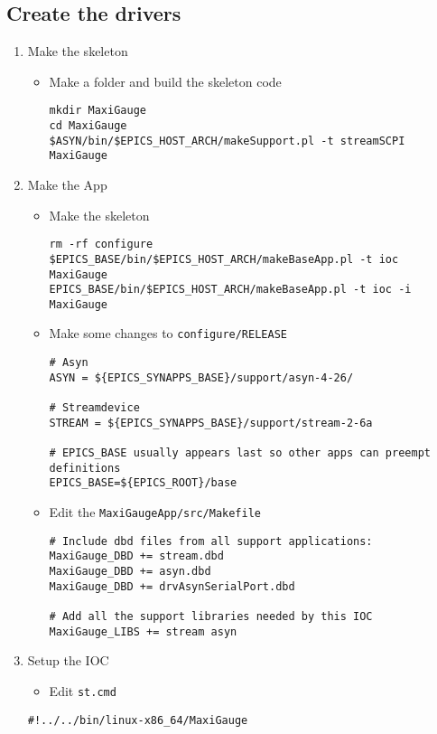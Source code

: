 \documentclass[11pt]{article}
\begin{document}
\subsection{Create the drivers}
\label{sec-2-1}
\begin{enumerate}
\item Make the skeleton
\label{sec-2-1-1}
\begin{itemize}
\item Make a folder and build the skeleton code
\begin{verbatim}
mkdir MaxiGauge
cd MaxiGauge
$ASYN/bin/$EPICS_HOST_ARCH/makeSupport.pl -t streamSCPI MaxiGauge
\end{verbatim}
\end{itemize}

\item Make the App
\label{sec-2-1-2}
\begin{itemize}
\item Make the skeleton
\begin{verbatim}
rm -rf configure
$EPICS_BASE/bin/$EPICS_HOST_ARCH/makeBaseApp.pl -t ioc MaxiGauge
EPICS_BASE/bin/$EPICS_HOST_ARCH/makeBaseApp.pl -t ioc -i MaxiGauge
\end{verbatim}
\item Make some changes to \verb~configure/RELEASE~
\begin{verbatim}
# Asyn
ASYN = ${EPICS_SYNAPPS_BASE}/support/asyn-4-26/

# Streamdevice
STREAM = ${EPICS_SYNAPPS_BASE}/support/stream-2-6a

# EPICS_BASE usually appears last so other apps can preempt definitions
EPICS_BASE=${EPICS_ROOT}/base
\end{verbatim}
\item Edit the \verb~MaxiGaugeApp/src/Makefile~
\begin{verbatim}
# Include dbd files from all support applications:
MaxiGauge_DBD += stream.dbd
MaxiGauge_DBD += asyn.dbd
MaxiGauge_DBD += drvAsynSerialPort.dbd

# Add all the support libraries needed by this IOC
MaxiGauge_LIBS += stream asyn
\end{verbatim}
\end{itemize}

\item Setup the IOC
\label{sec-2-1-3}
\begin{itemize}
\item Edit \verb~st.cmd~
\end{itemize}
\begin{verbatim}
#!../../bin/linux-x86_64/MaxiGauge


\end{verbatim}
\end{enumerate}
\end{document}

